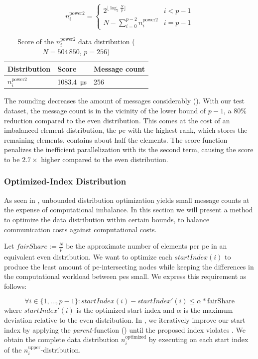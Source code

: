 \begin{equation}
\label{eq:roundDownPower2Distribution}
n_i^\textrm{power2} = \begin{cases}
2^{\lfloor \log_2 \frac{N}{p} \rfloor} & i < p - 1\\
N - \sum_{i=0}^{p-2} n_i^\textrm{power2} & i = p - 1
\end{cases}
\end{equation}

\begin{table}
\caption{Score of the $n_i^\textrm{power2}$ data distribution ($N = 504\,850$, $p=256$)}
\label{table:Power2DistributionScore}
\centering
\begin{tabular}{l|l|l}
Distribution & Score & Message count \\
\hline
$n_i^\textrm{power2}$ & \SI{1083.4}{\micro\second} & 256
\end{tabular}
\end{table}

The rounding decreases the amount of messages considerably ().
With our test dataset, the message count is in the vicinity of the lower bound of $p - 1$, a $80\%$ reduction compared to the even distribution.
This comes at the cost of an imbalanced element distribution, the \gls{pe} with the highest rank, which stores the remaining elements, contains about half the elements.
The score function penalizes the inefficient parallelization with its the second term, causing the score to be $2.7\times$ higher compared to the even distribution.

\subsubsection{Optimized-Index Distribution}
As seen in , unbounded distribution optimization yields small message counts at the expense of computational imbalance.
In this section we will present a method to optimize the data distribution within certain bounds, to balance communication costs against computational costs.

Let $\textit{fairShare} := \tfrac{N}{p}$ be the approximate number of elements per \gls{pe} in an equivalent even distribution.
We want to optimize each $\textit{startIndex}(i)$ to produce the least amount of \gls{pe}-intersecting nodes while keeping the differences in the computational workload between \glspl{pe} small.
We express this requirement as follows:

\begin{equation}
\label{eq:optimizedIndexBounds}
\forall i \in \{1, \ldots, p - 1\}: \textit{startIndex}(i) - \textit{startIndex}'(i) \leq \alpha * \textrm{fairShare}
\end{equation}
where $\textit{startIndex}'(i)$ is the optimized start index and $\alpha$ is the maximum deviation relative to the even distribution.
In , we iteratively improve our start index by applying the \textit{parent}-function () until the proposed index violates .
We obtain the complete data distribution $n_i^\textrm{optimized}$ by executing  on each start index of the $n_i^\textrm{upper}$-distribution.


